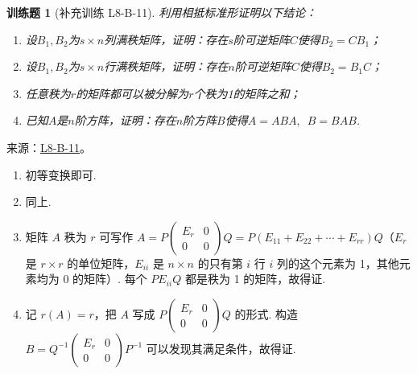 \documentclass[12pt,fontset=fandol]{ctexart}
\newtheorem{exercise}{训练题}[section]
\begin{document}
\begin{exercise}[补充训练 L8-B-11]\label{prob:L8-B-11}
利用相抵标准形证明以下结论：
        \begin{enumerate}
            \item 设$B_1,B_2$为$s \times n$列满秩矩阵，证明：存在$s$阶可逆矩阵$C$使得$B_2=CB_1$；

            \item 设$B_1,B_2$为$s \times n$行满秩矩阵，证明：存在$n$阶可逆矩阵$C$使得$B_2=B_1C$；

            \item 任意秩为$r$的矩阵都可以被分解为$r$个秩为1的矩阵之和；

            \item 已知$A$是$n$阶方阵，证明：存在$n$阶方阵$B$使得$A=ABA,\enspace B=BAB$.
        \end{enumerate}
\end{exercise}
\noindent 来源：\href{https://github.com/yhwu-is/Linear-Algebra-Left-Undone/blob/new/%E8%AE%B2%E4%B9%89/%E4%B8%93%E9%A2%98/8%20%E7%9B%B8%E6%8A%B5%E6%A0%87%E5%87%86%E5%BD%A2.tex}{L8-B-11}。
\begin{solve}
\begin{enumerate}
                \item 初等变换即可.

                \item 同上.

                \item 矩阵 $A$ 秩为 $r$ 可写作 $A=P\begin{pmatrix}E_r & 0 \\ 0 & 0\end{pmatrix}Q = P(E_{11}+E_{22}+\cdots+E_{rr})Q$（$E_r$ 是 $r\times r$ 的单位矩阵，$E_{ii}$ 是 $n\times n$ 的只有第 $i$ 行 $i$ 列的这个元素为 1，其他元素均为 0 的矩阵）. 每个 $PE_{ii}Q$ 都是秩为 1 的矩阵，故得证.

                \item 记 $r(A)=r$，把 $A$ 写成 $P\begin{pmatrix}E_r & 0 \\ 0 & 0\end{pmatrix}Q$ 的形式. 构造 $B=Q^{-1}\begin{pmatrix}E_r & 0 \\ 0 & 0\end{pmatrix}P^{-1}$ 可以发现其满足条件，故得证.
            \end{enumerate}
\end{solve}
\end{document}
